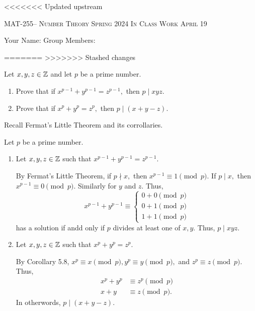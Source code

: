 \documentclass[handout]{ximera}
\date{April 19, 2024}
\date{\classday, 2024}
\begin{document}
\handoutAbstract
\maketitle
<<<<<<< Updated upstream
 	\begin{center}%
    		{\large \scshape MAT-255-- Number Theory 
			\hfill Spring 2024 
			\hfill In Class Work April 19}%
    
		{\large Your Name: \hrulefill \quad 
			Group Members:\hrulefill \quad 
			\hrulefill
			\par}%
 	\end{center}%
	 
=======
>>>>>>> Stashed changes

\begin{br}
    Let $x,y,z\in\mathbb Z$ and let $p$ be a prime number.
    
    \begin{enumerate}
        \item Prove that if $x^{p-1}+y^{p-1}=z^{p-1},$ then $p\mid xyz.$
        \item Prove that if $x^{p}+y^{p}=z^{p},$ then $p\mid (x+y-z).$
    \end{enumerate}
    \begin{hint}
        Recall Fermat's Little Theorem and its corrollaries.
    \end{hint}

    \begin{solution}
        Let  $p$ be a prime number.

        \begin{enumerate}
            \item Let $x,y,z\in\mathbb Z$ such that $x^{p-1}+y^{p-1}=z^{p-1}.$ 
            
            By Fermat's Little Theorem, if $p\nmid x,$ then $x^{p-1}\equiv 1\pmod{p}.$ If $p\mid x,$ then $x^{p-1}\equiv 0\pmod{p}.$ Similarly for $y$ and $z.$ Thus, 
            \[x^{p-1}+y^{p-1}\equiv 
                \begin{cases}
                    0 + 0 \pmod{p}\\
                    0 + 1 \pmod{p}\\
                    1 + 1 \pmod{p}
                \end{cases}
            \]
            has a solution if andd only if $p$ divides at least one of $x,y$. Thus, $p\mid xyz.$
            \item Let $x,y,z\in\mathbb Z$ such that $x^{p}+y^{p}=z^{p}.$ 
            
            By Corollary 5.8, $x^{p}\equiv x\pmod{p},  y^p\equiv y\pmod{p},$ and $z^p\equiv z \pmod{p}.$ Thus,
            \begin{align*}
                x^{p}+y^{p}& \equiv z^{p}\pmod{p}\\
                x+y& \equiv z\pmod{p}.
            \end{align*}
            In otherwords, $p\mid (x+y-z).$
        \end{enumerate}
    \end{solution}
\end{br}
\end{document}

